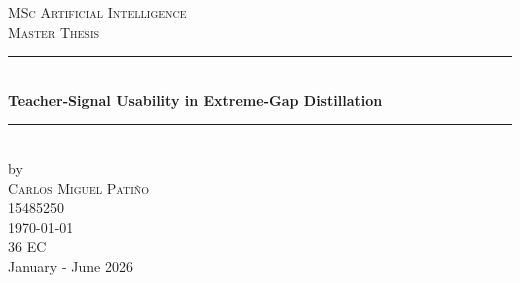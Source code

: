 \begin{titlepage}

\newcommand{\HRule}{\rule{\linewidth}{0.5mm}}

\center


\textsc{\Large MSc Artificial Intelligence}\\[0.2cm]

\textsc{\Large Master Thesis}\\[0.5cm]


\HRule \\[0.4cm]

{ \huge \bfseries Teacher-Signal Usability in Extreme-Gap Distillation}\\[0.4cm]

\HRule \\[0.5cm]


by\\[0.2cm]

\textsc{\Large Carlos Miguel Patiño}\\[0.2cm]

15485250\\[1cm]


{\Large \today}\\[1cm]

36 EC\\

January - June 2026\\[1cm]



\end{titlepage}
